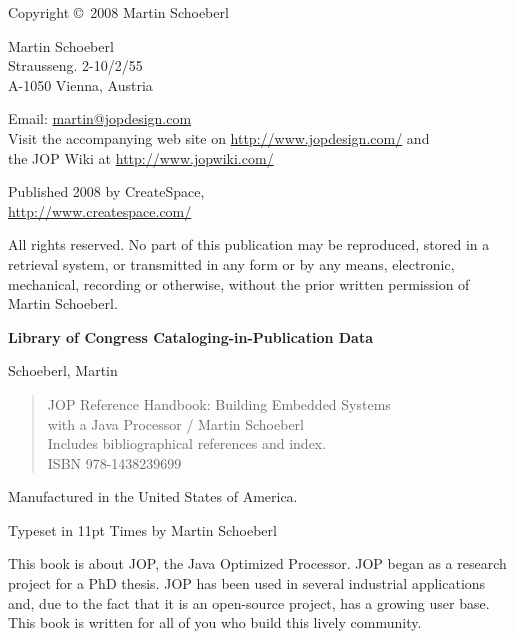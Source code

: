 \thispagestyle{empty}
\begin{flushleft}
{\small

Copyright \copyright \ 2008 Martin Schoeberl
\medskip

Martin Schoeberl\\
Strausseng. 2-10/2/55\\
A-1050 Vienna, Austria\\
\medskip

Email: \url{martin@jopdesign.com}\\
Visit the accompanying web site on \url{http://www.jopdesign.com/}
and\\
the JOP Wiki at \url{http://www.jopwiki.com/}
\medskip

Published 2008 by CreateSpace,\\
\url{http://www.createspace.com/}



\medskip


All rights reserved. No part of this publication may be reproduced,
stored in a retrieval system, or transmitted in any form or by any
means, electronic, mechanical, recording or otherwise, without the
prior written permission of Martin Schoeberl.
\medskip


\textbf{Library of Congress Cataloging-in-Publication Data}
\medskip

Schoeberl, Martin
\begin{quote}
    JOP Reference Handbook: Building Embedded Systems\\
    with a Java Processor / Martin Schoeberl\\
    Includes bibliographical references and index.\\
    ISBN 978-1438239699
\end{quote}

\bigskip


Manufactured in the United States of America.

Typeset in 11pt Times by Martin Schoeberl}
\end{flushleft}



This book is about JOP, the Java Optimized Processor. JOP began as a
research project for a PhD thesis. JOP has been used in several
industrial applications and, due to the fact that it is an
open-source project, has a growing user base. This book is written
for all of you who build this lively community.

